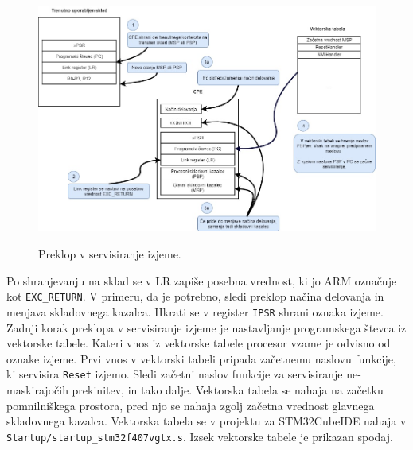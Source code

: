 \documentclass[12pt,letterpaper]{article}
\begin{document}
\begin{figure}[ht!]
  \centering
  \caption{Preklop v servisiranje izjeme.}
  \includegraphics[width=390pt]{images/vaja6/contextswitch.jpg}
  \label{contextSwitch}
\end{figure}

Po shranjevanju na sklad se v LR zapiše posebna vrednost, ki jo ARM označuje kot \texttt{EXC\_RETURN}. V primeru, da je potrebno, sledi preklop načina delovanja in menjava skladovnega kazalca. Hkrati se v register \texttt{IPSR} shrani oznaka izjeme. Zadnji korak preklopa v servisiranje izjeme je nastavljanje programskega števca iz vektorske tabele. Kateri vnos iz vektorske tabele procesor vzame je odvisno od oznake izjeme. Prvi vnos v vektorski tabeli pripada začetnemu naslovu funkcije, ki servisira \texttt{Reset} izjemo. Sledi začetni naslov funkcije za servisiranje ne-maskirajočih prekinitev, in tako dalje. Vektorska tabela se nahaja na začetku pomnilniškega prostora, pred njo se nahaja zgolj začetna vrednost glavnega skladovnega kazalca. Vektorska tabela se v projektu za STM32CubeIDE nahaja v \texttt{Startup/startup\_stm32f407vgtx.s}. Izsek vektorske tabele je prikazan spodaj.
\end{document}
